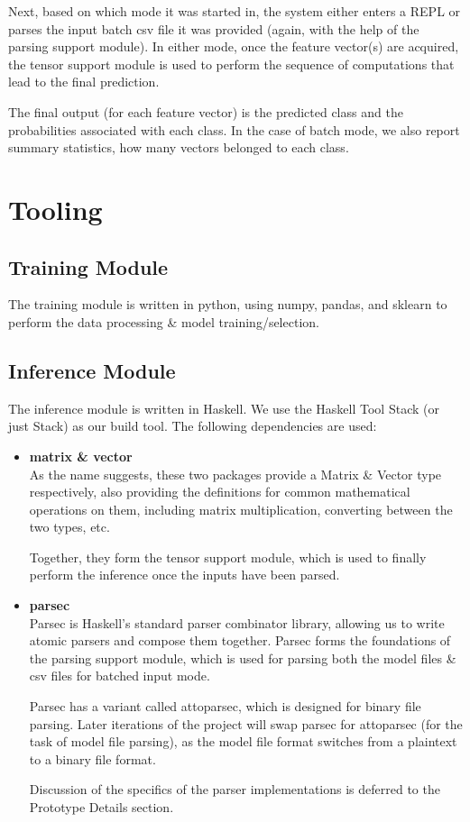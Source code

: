 \documentclass[12pt]{article}
\begin{document}
Next, based on which mode it was started in, the system either enters a REPL or parses the input batch csv file it was provided (again, with the help of the parsing support module). In either mode, once the feature vector(s) are acquired, the tensor support module is used to perform the sequence of computations that lead to the final prediction.\bigskip

The final output (for each feature vector) is the predicted class and the probabilities associated with each class. In the case of batch mode, we also report summary statistics, how many vectors belonged to each class.

\section{Tooling}
\subsection{Training Module}
The training module is written in python, using numpy, pandas, and sklearn to perform the data processing \& model training/selection.\bigskip

\subsection{Inference Module}
The inference module is written in Haskell. We use the Haskell Tool Stack (or just Stack) as our build tool. The following dependencies are used:
\begin{itemize}
	\item \textbf{matrix \& vector}\\
	As the name suggests, these two packages provide a Matrix \& Vector type respectively, also providing the definitions for common mathematical operations on them, including matrix multiplication, converting between the two types, etc.\bigskip

	Together, they form the tensor support module, which is used to finally perform the inference once the inputs have been parsed.

	\item \textbf{parsec}\\
	Parsec is Haskell's standard parser combinator library, allowing us to write atomic parsers and compose them together. Parsec forms the foundations of the parsing support module, which is used for parsing both the model files \& csv files for batched input mode.\bigskip

	Parsec has a variant called attoparsec, which is designed for binary file parsing. Later iterations of the project will swap parsec for attoparsec (for the task of model file parsing), as the model file format switches from a plaintext to a binary file format.

	Discussion of the specifics of the parser implementations is deferred to the Prototype Details section.
\end{itemize}
\end{document}
